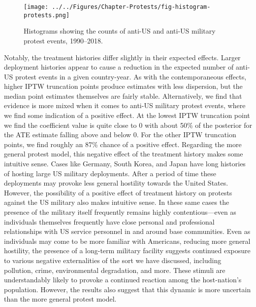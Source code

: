 \begin{figure}[t]
	\centering\texttt{[image: ../../Figures/Chapter-Protests/fig-histogram-protests.png]}
	\caption{Histograms showing the counts of anti-US and anti-US military protest events, 1990--2018.}
	\label{fig:protesthistograms}
\end{figure}


Notably, the treatment histories differ slightly in their expected effects. Larger deployment histories appear to cause a reduction in the expected number of anti-US protest events in a given country-year. As with the contemporaneous effects, higher IPTW truncation points produce estimates with less dispersion, but the median point estimates themselves are fairly stable. Alternatively, we find that evidence is more mixed when it comes to anti-US military protest events, where we find some indication of a positive effect. At the lowest IPTW truncation point we find the coefficient value is quite close to 0 with about 50\% of the posterior for the ATE estimate falling above and below 0. For the other IPTW truncation points, we find roughly an 87\% chance of a positive effect. Regarding the more general protest model, this negative effect of the treatment history makes some intuitive sense. Cases like Germany, South Korea, and Japan have long histories of hosting large US military deployments. After a period of time these deployments may provoke less general hostility towards the United States. However, the possibility of a positive effect of treatment history on protests against the US military also makes intuitive sense. In these same cases the presence of the military itself frequently remains highly contentious---even as individuals themselves frequently have close personal and professional relationships with US service personnel in and around base communities. Even as individuals may come to be more familiar with Americans, reducing more general hostility, the presence of a long-term military facility suggests continued exposure to various negative externalities of the sort we have discussed, including pollution, crime, environmental degradation, and more. These stimuli are understandably likely to provoke a continued reaction among the host-nation's population. However, the results also suggest that this dynamic is more uncertain than the more general protest model.


